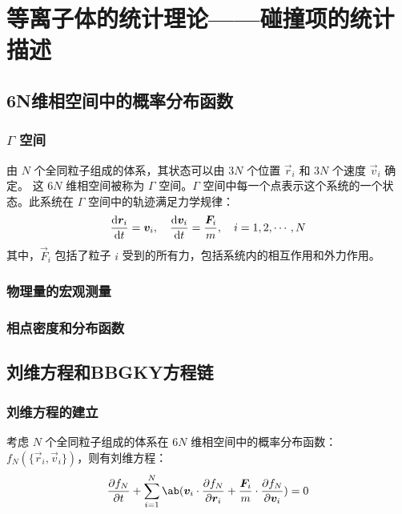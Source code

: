 
\chapter{等离子体的统计理论——碰撞项的统计描述}

\section{6N维相空间中的概率分布函数}

\subsection{\texorpdfstring{$\Gamma$}{Gamma} 空间}

由 $N$ 个全同粒子组成的体系，其状态可以由 $3N$ 个位置 $\vec{r}_i$ 和 $3N$ 个速度 $\vec{v}_i$ 确定。
这 $6N$ 维相空间被称为 $\Gamma$ 空间。$\Gamma$ 空间中每一个点表示这个系统的一个状态。此系统在 $\Gamma$ 空间中的轨迹满足力学规律：
\begin{equation}
\odv{\vec{r}_i}{t} = \vec{v}_i,
\quad \odv{\vec{v}_i}{t} = \frac{\vec{F}_i}{m},
\quad i = 1, 2, \cdots, N
\end{equation}
其中，$\vec{F}_i$ 包括了粒子 $i$ 受到的所有力，包括系统内的相互作用和外力作用。

\subsection{物理量的宏观测量}

\subsection{相点密度和分布函数}

\section{刘维方程和BBGKY方程链}

\subsection{刘维方程的建立}

考虑 $N$ 个全同粒子组成的体系在 $6N$ 维相空间中的概率分布函数：
$f_N(\{\vec{r}_i, \vec{v}_i\})$，则有刘维方程：
\begin{equation}
\pdv{f_N}{t} + \sum_{i=1}^N \ab(
    \vec{v}_i \cdot \pdv{f_N}{\vec{r}_i}
    + \frac{\vec{F}_i}{m} \cdot \pdv{f_N}{\vec{v}_i}
) = 0
\end{equation}

